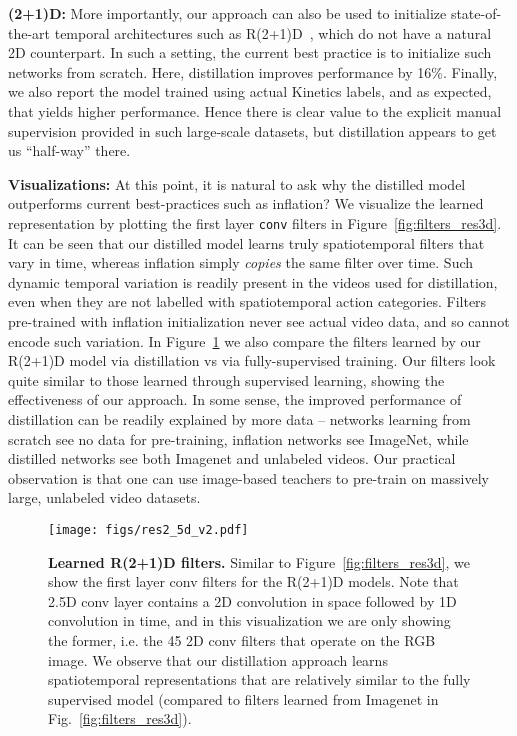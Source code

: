 \documentclass[10pt,twocolumn,letterpaper]{article}
\begin{document}
{\noindent \bf (2+1)D:} More importantly, our approach can also be used to initialize state-of-the-art temporal architectures such as R(2+1)D~\cite{tran2018closer}, which do not have a natural 2D counterpart. In such a setting, the current best practice is to initialize such networks from scratch. Here, distillation improves performance by 16\%. Finally, we also report the model trained using actual Kinetics labels, and as expected, that yields higher performance. Hence there is clear value to the explicit manual supervision provided in such large-scale datasets, but distillation appears to get us ``half-way'' there.

{\noindent \bf Visualizations:} At this point, it is natural to ask why the distilled model outperforms current best-practices such as inflation? We visualize the learned representation by plotting the first layer \texttt{conv} filters in Figure~\ref{fig:filters_res3d}. It can be seen that our distilled model learns truly spatiotemporal filters that vary in time, whereas inflation simply {\em copies} the same filter over time. Such dynamic temporal variation is readily present in the videos used for distillation, even when they are not labelled with spatiotemporal action categories. Filters pre-trained with inflation initialization never see actual video data, and so cannot encode such variation. In Figure~\ref{fig:filters_R(2+1)D} we also compare the filters learned by our R(2+1)D model via distillation vs via fully-supervised training. Our filters look quite similar to those learned through supervised learning, showing the effectiveness of our approach. In some sense, the improved performance of distillation can be readily explained by more data --  networks learning from scratch see no data for pre-training, inflation networks see ImageNet, while distilled networks see both Imagenet and unlabeled videos. Our practical observation is that one can use image-based teachers to pre-train on massively large, unlabeled video datasets.



\begin{figure}[t]
    \centering
    \texttt{[image: figs/res2\_5d\_v2.pdf]}
    \caption{
    {\bf Learned R(2+1)D filters.}
    Similar to Figure~\ref{fig:filters_res3d}, we show the first layer conv filters for the R(2+1)D models.
    Note that 2.5D conv layer contains a 2D convolution in space followed by 1D convolution in time, and in this visualization
    we are only showing the former, i.e. the 45 2D conv filters that operate on the RGB image. We observe that our distillation approach learns spatiotemporal representations that are relatively
    similar to the fully supervised model (compared to 
    filters learned from Imagenet in Fig.~\ref{fig:filters_res3d}).
    }
    \label{fig:filters_R(2+1)D}
\end{figure}
\end{document}

